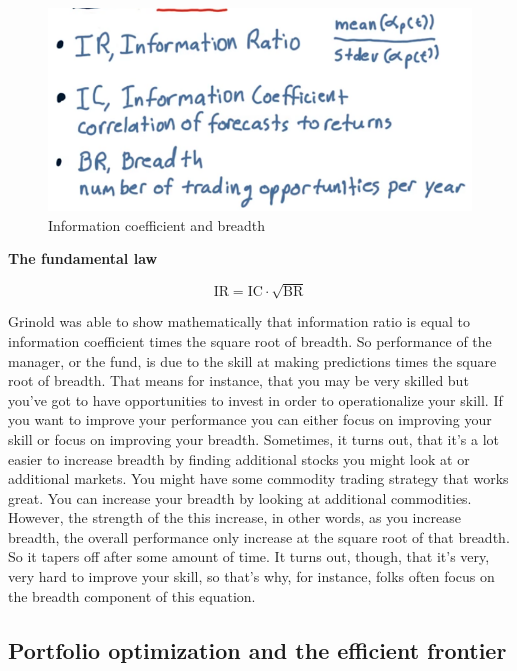 \documentclass[12pt]{article}
\begin{document}
\begin{figure}[!ht]
\centering
\includegraphics[scale=0.4]{fig/fig66}
\caption{Information coefficient and breadth}
\end{figure}

\noindent
\textbf{The fundamental law} 

\begin{equation}
\text{IR} = \text{IC} \cdot \sqrt{\text{BR}}
\end{equation}

Grinold was able to show mathematically that information ratio is equal to information coefficient times the square root of breadth. So performance of the manager, or the fund, is due to the skill at making predictions times the square root of breadth. That means for instance, that you may be very skilled but you've got to have opportunities to invest in order to operationalize your skill. If you want to improve your performance you can either focus on improving your skill or focus on improving your breadth. Sometimes, it turns out, that it's a lot easier to increase breadth by finding additional stocks you might look at or additional markets. You might have some commodity trading strategy that works great. You can increase your breadth by looking at additional commodities. However, the strength of the this increase, in other words, as you increase breadth, the overall performance only increase at the square root of that breadth. So it tapers off after some amount of time. It turns out, though, that it's very, very hard to improve your skill, so that's why, for instance, folks often focus on the breadth component of this equation. 

\subsection{Portfolio optimization and the efficient frontier}
\end{document}
